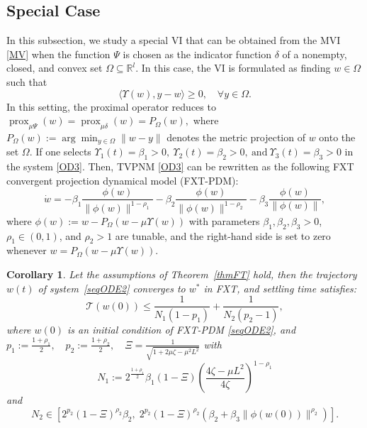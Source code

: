 \documentclass{article}
\theoremstyle{plain}%
\newtheorem{corollary}{Corollary}[section]%
\theoremstyle{thmstyletwo}%
\theoremstyle{thmstylethree}%
\begin{document}
\subsection{Special Case}
In this subsection, we study a special VI that can be obtained from the MVI \eqref{MV} when the function $\Psi$ is chosen as the indicator function $\delta$ of a nonempty, closed, and convex set $\Omega \subseteq \mathbb{R}^l$. In this case, the VI is formulated as finding $w\in\Omega$ such that
\[
\langle \Upsilon(w), y-w\rangle \ge 0, \quad \forall y\in\Omega.
\]
In this setting, the proximal operator reduces to
\(
\operatorname{prox}_{\mu\Psi}(w)
=\operatorname{prox}_{\mu\delta}(w)
= P_{\Omega}(w),
\)
where
\(
P_{\Omega}(w):=\arg\min_{y\in\Omega}\|w-y\|
\)
denotes the metric projection of $w$ onto the set $\Omega$. If one selects
\(
\Upsilon_1(t)=\beta_1>0,
\ 
\Upsilon_2(t)=\beta_2>0,\ \text{and} \
\Upsilon_3(t)=\beta_3>0
\) in the system \eqref{OD3}.
Then, TVPNM \eqref{OD3} can be rewritten as the following FXT convergent projection dynamical model (FXT-PDM):
\begin{equation}\label{seqODE2}
    \dot{w}
=
-\beta_1 \frac{\phi(w)}{\|\phi(w)\|^{1-\rho_1}}
-\beta_2 \frac{\phi(w)}{\|\phi(w)\|^{1-\rho_2}}
-\beta_3 \frac{\phi(w)}{\|\phi(w)\|},
\end{equation}
where $\phi(w):=w-P_{\Omega}(w-\mu\Upsilon(w))$ with parameters
$\beta_1,\beta_2,\beta_3>0$, $\rho_1\in(0,1)$, and $\rho_2>1$ are tunable, and the
right-hand side is set to zero whenever $w=P_{\Omega}(w-\mu\Upsilon(w))$.\\
\begin{corollary}\label{croFT}
Let the assumptions of Theorem~\eqref{thmFT} hold,
then the trajectory $w(t)$ of system~\eqref{seqODE2} converges to $w^*$ in FXT, and settling time satisfies:
\begin{equation}
  \mathcal{T}(w(0)) \leq \frac{1}{N_1(1 - p_1)} + \frac{1}{N_2(p_2 - 1)},  
\end{equation}
where $w(0)$ is an initial condition of FXT-PDM \eqref{seqODE2}, and \(p_1 := \frac{1+\rho_1}{2}, \quad p_2 := \frac{1+\rho_2}{2},\quad \Xi=\frac{1}{\sqrt{1+2\mu\zeta-\mu^2L^2}}\) with
\begin{equation}\label{OD3eq3}
    N_1 := 2^{\frac{1+\rho_1}{2}} \beta_1(1-\Xi) \left( \frac{4\zeta - \mu L^2}{4\zeta} \right)^{1-\rho_1}
\end{equation}
and
\begin{equation}\label{OD3eq4}
   N_2 \in \left[ 2^{p_2}(1- \Xi)^{\rho_2} \beta_2, \; 2^{p_2}(1- \Xi)^{\rho_2} \left( \beta_2 + \beta_3 \|\phi(w(0))\|^{\rho_2} \right) \right]. 
\end{equation}
\end{corollary}
\end{document}
